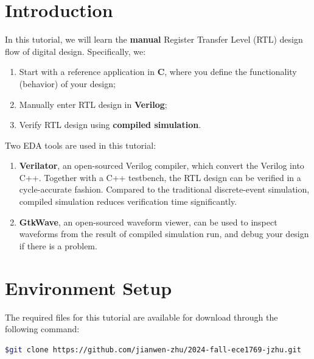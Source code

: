 \documentclass[12pt]{article}
\begin{document}
\pagebreak


\section{Introduction}

In this tutorial, we will learn the {\bf manual} Register Transfer Level
(RTL) design flow of digital design. Specifically, we:


\begin{enumerate}
\item Start with a reference application in {\bf C}, where you define the
functionality (behavior) of your design;
  
\item Manually enter RTL design in {\bf Verilog};
  
\item Verify RTL design using {\bf compiled simulation}.
\end{enumerate}

Two EDA tools are used in this tutorial:

\begin{enumerate}
\item {\bf Verilator}, an open-sourced Verilog compiler, which convert
  the Verilog into C++. Together with a C++ testbench, the RTL design
  can be verified in a cycle-accurate fashion. Compared to the
  traditional discrete-event simulation, compiled simulation reduces
  verification time significantly.
  

\item {\bf GtkWave}, an open-sourced waveform viewer, can be used to
  inspect waveforms from the result of compiled simulation run, and
  debug your design if there is a problem.
  
\end{enumerate}


\section{Environment Setup}

The required files for this tutorial are available for download
through the following command:

\begin{lstlisting}[language=bash]
  $git clone https://github.com/jianwen-zhu/2024-fall-ece1769-jzhu.git
\end{lstlisting}
\end{document}

